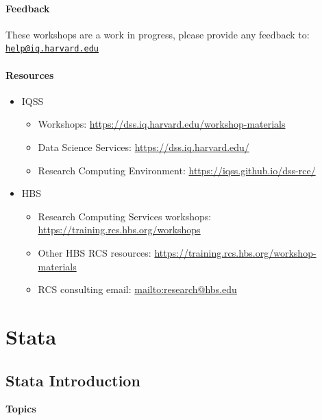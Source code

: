 \documentclass[
]{book}
\providecommand{\tightlist}{%
  \setlength{\itemsep}{0pt}\setlength{\parskip}{0pt}}
\begin{document}
\hypertarget{feedback-6}{%
\subsection{Feedback}\label{feedback-6}}

These workshops are a work in progress, please provide any feedback to: \href{mailto:help@iq.harvard.edu}{\nolinkurl{help@iq.harvard.edu}}

\hypertarget{resources-8}{%
\subsection{Resources}\label{resources-8}}

\begin{itemize}
\tightlist
\item
  IQSS

  \begin{itemize}
  \tightlist
  \item
    Workshops: \url{https://dss.iq.harvard.edu/workshop-materials}
  \item
    Data Science Services: \url{https://dss.iq.harvard.edu/}
  \item
    Research Computing Environment: \url{https://iqss.github.io/dss-rce/}
  \end{itemize}
\item
  HBS

  \begin{itemize}
  \tightlist
  \item
    Research Computing Services workshops: \url{https://training.rcs.hbs.org/workshops}
  \item
    Other HBS RCS resources: \url{https://training.rcs.hbs.org/workshop-materials}
  \item
    RCS consulting email: \url{mailto:research@hbs.edu}
  \end{itemize}
\end{itemize}

\hypertarget{part-stata}{%
\part{Stata}\label{part-stata}}

\hypertarget{stata-introduction}{%
\chapter{Stata Introduction}\label{stata-introduction}}

\textbf{Topics}
\end{document}

